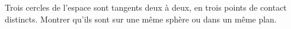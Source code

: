 Trois cercles de l'espace sont tangents deux à deux, en trois points de contact distincts. Montrer qu'ils sont sur une même sphère ou dans un même plan.
